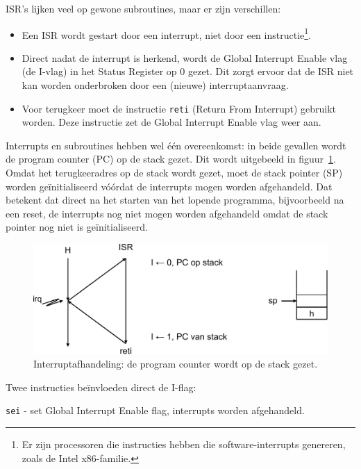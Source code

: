 ISR's lijken veel op gewone subroutines, maar er zijn verschillen:

\begin{itemize}
\item Een ISR wordt gestart door een interrupt, niet door een
instructie\footnote{Er zijn processoren die instructies hebben die
software-interrupts genereren, zoals de Intel x86-familie.}.

\item Direct nadat de interrupt is herkend, wordt de Global Interrupt Enable
vlag (de I-vlag) in het Status Register op 0 gezet. Dit zorgt ervoor dat de
ISR niet kan worden onderbroken door een (nieuwe) interruptaanvraag.

\item Voor terugkeer moet de instructie \lstinline|reti| (Return From
Interrupt) gebruikt worden. Deze instructie zet de Global Interrupt Enable
vlag weer aan.
\end{itemize}

Interrupts en subroutines hebben wel \'e\'en overeenkomst: in beide gevallen
wordt de program counter (PC) op de stack gezet. Dit wordt uitgebeeld in
figuur~\ref{fig:intinterruptdispatchwithstackandiflag}. Omdat het
terugkeeradres op de stack wordt gezet, moet de stack pointer (SP) worden
ge\"initialiseerd v\'o\'ordat de interrupts mogen worden afgehandeld. Dat
betekent dat direct na het starten van het lopende programma, bijvoorbeeld
na een reset, de interrupts nog niet mogen worden afgehandeld omdat de
stack pointer nog niet is ge\"initialiseerd.

\begin{figure}[!ht]
\centering
\includegraphics[scale=\figscale]{images/intinterruptdispatchwithstackandiflag}
\caption{Interruptafhandeling: de program counter wordt op de stack gezet.}
\label{fig:intinterruptdispatchwithstackandiflag}
\end{figure}

Twee instructies be\"invloeden direct de I-flag:

\qquad \lstinline|sei| - set Global Interrupt Enable flag, interrupts worden
afgehandeld.

